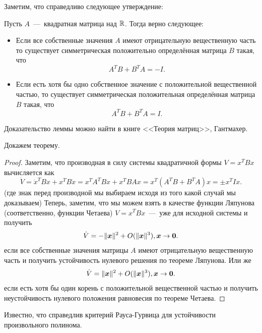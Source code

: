 Заметим, что справедливо следующее утверждение:
\begin{lemma}
    Пусть $A$~---~квадратная матрица над $\mathbb{R}$.
    Тогда верно следующее:
    \begin{itemize}
        \item Если все собственные значения $A$ имеют отрицательную вещественную часть то существует симметрическая положительно определённая матрица $B$ такая, что
        \[
            A^{T}B + B^{T}A = -I.
        \]
        \item Если есть хотя бы одно собственное значение с положительной вещественной частью, то существует симметрическая положительная определённая матрица $B$ такая, что
        \[
            A^T B + B^T A = I.
        \]
    \end{itemize}
\end{lemma}
\begin{note}
    Доказательство леммы можно найти в книге <<Теория матриц>>, Гантмахер.
\end{note}
Докажем теорему.
\begin{proof}
    Заметим, что производная в силу системы квадратичной формы $V = x^TBx$ вычисляется как
    \[
        \dot{V} = \dot{x}^T B x + x^T B \dot{x} = x^T A^T B x + x^T B A x = x^T (A^T B + B^T A) x = \pm x^T I x.
    \]
    (где знак перед производной мы выбираем исходя из того какой случай мы доказываем)
    Теперь, заметим, что мы можем взять в качестве функции Ляпунова (соответственно, функции Четаева) $V = x^T B x$~---~уже для исходной системы и получить
    \[
        \dot{V} = -\|\boldsymbol{x}\|^2 + O(\|\boldsymbol{x}\|^3), \boldsymbol{x} \rightarrow \boldsymbol{0}.
    \]
    если все собственные значения матрицы $A$ имеют отрицательную вещественную часть и получить устойчивость нулевого решения по теореме Ляпунова.
    Или же
    \[
        \dot{V} = \|\boldsymbol{x}\|^2 + O(\|\boldsymbol{x}\|^3), \boldsymbol{x} \rightarrow \boldsymbol{0}.
    \]
    если есть хотя бы один корень с положительной вещественной частью и получить неустойчивость нулевого положения равновесия по теореме Четаева.
\end{proof}
Известно, что справедлив критерий Рауса-Гурвица для устойчивости произвольного полинома.
